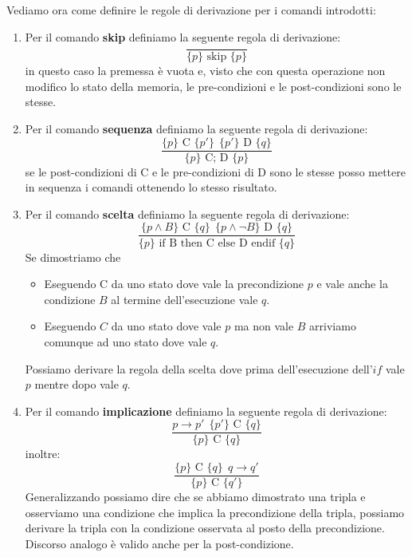 Vediamo ora come definire le regole di derivazione per i comandi introdotti:
\begin{enumerate}
    \item Per il comando \textbf{skip} definiamo la seguente regola di derivazione:
    \begin{equation}
        \frac{}{\{p\} \text{ skip } \{p\}}
    \end{equation}
    in questo caso la premessa è vuota e, visto che con questa operazione non modifico lo stato della memoria, le pre-condizioni e le post-condizioni sono le stesse.
    \item Per il comando \textbf{sequenza} definiamo la seguente regola di derivazione:
    \begin{equation}
        \frac{\{p\} \text{ C } \{p'\} \ \ \{p'\} \text{ D } \{q\}}{\{p\} \text{ C; D } \{p\}}
    \end{equation}
    se le post-condizioni di C  e le pre-condizioni di D sono le stesse posso mettere in sequenza i comandi ottenendo lo stesso risultato.
        \item Per il comando \textbf{scelta} definiamo la seguente regola di derivazione:
    \begin{equation}
        \frac{\{p \land B\} \text{ C } \{q\} \ \ \{p \land \lnot B\} \text{ D } \{q\}}{\{p\} \text{ if B then C else D endif } \{q\}}
    \end{equation}
    Se dimostriamo che
    \begin{itemize}
        \item Eseguendo C da uno stato dove vale la precondizione $p$ e vale anche la condizione $B$ al termine dell'esecuzione vale $q$.
        \item Eseguendo $C$ da uno stato dove vale $p$ ma non vale $B$ arriviamo comunque ad uno stato dove vale $q$.
    \end{itemize}
    Possiamo derivare la regola della scelta dove prima dell'esecuzione dell'$if$ vale $p$ mentre dopo vale $q$.
    \item Per il comando \textbf{implicazione} definiamo la seguente regola di derivazione:
    \begin{equation}
        \frac{p \to p' \ \ \{p'\} \text{ C } \{q\}}{\{p\} \text{ C } \{q\}}
    \end{equation}
    inoltre:
    \begin{equation}
        \frac{\{p\} \text{ C } \{q\} \ \ q \to q'}{\{p\} \text{ C } \{q'\}}
    \end{equation}
    Generalizzando possiamo dire che se abbiamo dimostrato una tripla e osserviamo una condizione che implica la precondizione della tripla, possiamo derivare la tripla con la condizione osservata al posto della precondizione. Discorso analogo è valido anche per la post-condizione.

\end{enumerate}
